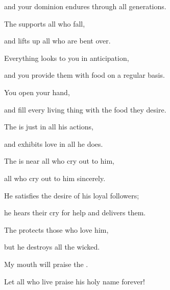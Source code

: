 {\par }{\Q and your dominion
endures
through
all
generations.
\par }{\Q The
{}
supports
all
who fall,
\par }{\Q and lifts
up all
who are bent over.
\par }{\Q {}Everything
looks
to you in anticipation,
\par }{\Q and you
provide
them
with food
on a
regular basis.
\par }{\Q {}You open
your hand,
\par }{\Q and fill
every
living
thing with the food they desire.
\par }{\Q {}The
{}
is just
in all
his actions,
\par }{\Q and exhibits love
in all
he does.
\par }{\Q {}The
{}
is near
all
who cry
out to him,
\par }{\Q all
who
cry
out to him sincerely.
\par }{\Q {}He satisfies the desire
of his loyal followers;
\par }{\Q he hears
their cry for help
and delivers them.
\par }{\Q {}The
{}
protects
those who love
him,
\par }{\Q but he destroys
all
the wicked.
\par }{\Q {}My mouth
will praise
the {}.

\par }{\Q Let all
who live
praise
his holy
name
forever!


}
